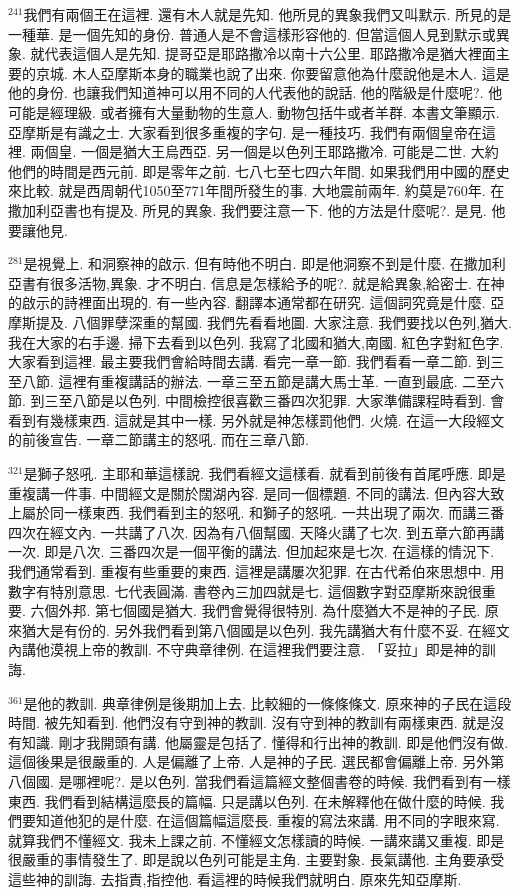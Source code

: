 \documentclass{book}
\begin{document}
$^{241}$我們有兩個王在這裡.
還有木人就是先知.
他所見的異象我們又叫默示.
所見的是一種華.
是一個先知的身份.
普通人是不會這樣形容他的.
但當這個人見到默示或異象.
就代表這個人是先知.
提哥亞是耶路撒冷以南十六公里.
耶路撒冷是猶大裡面主要的京城.
木人亞摩斯本身的職業也說了出來.
你要留意他為什麼說他是木人.
這是他的身份.
也讓我們知道神可以用不同的人代表他的說話.
他的階級是什麼呢?.
他可能是經理級.
或者擁有大量動物的生意人.
動物包括牛或者羊群.
本書文筆顯示.
亞摩斯是有識之士.
大家看到很多重複的字句.
是一種技巧.
我們有兩個皇帝在這裡.
兩個皇.
一個是猶大王烏西亞.
另一個是以色列王耶路撒冷.
可能是二世.
大約他們的時間是西元前.
即是零年之前.
七八七至七四六年間.
如果我們用中國的歷史來比較.
就是西周朝代1050至771年間所發生的事.
大地震前兩年.
約莫是760年.
在撒加利亞書也有提及.
所見的異象.
我們要注意一下.
他的方法是什麼呢?.
是見.
他要讓他見.

$^{281}$是視覺上.
和洞察神的啟示.
但有時他不明白.
即是他洞察不到是什麼.
在撒加利亞書有很多活物,異象.
才不明白.
信息是怎樣給予的呢?.
就是給異象,給密士.
在神的啟示的詩裡面出現的.
有一些內容.
翻譯本通常都在研究.
這個詞究竟是什麼.
亞摩斯提及.
八個罪孽深重的幫國.
我們先看看地圖.
大家注意.
我們要找以色列,猶大.
我在大家的右手邊.
掃下去看到以色列.
我寫了北國和猶大,南國.
紅色字對紅色字.
大家看到這裡.
最主要我們會給時間去講.
看完一章一節.
我們看看一章二節.
到三至八節.
這裡有重複講話的辦法.
一章三至五節是講大馬士革.
一直到最底.
二至六節.
到三至八節是以色列.
中間檢控很喜歡三番四次犯罪.
大家準備課程時看到.
會看到有幾樣東西.
這就是其中一樣.
另外就是神怎樣罰他們.
火燒.
在這一大段經文的前後宣告.
一章二節講主的怒吼.
而在三章八節.

$^{321}$是獅子怒吼.
主耶和華這樣說.
我們看經文這樣看.
就看到前後有首尾呼應.
即是重複講一件事.
中間經文是關於闊湖內容.
是同一個標題.
不同的講法.
但內容大致上屬於同一樣東西.
我們看到主的怒吼.
和獅子的怒吼.
一共出現了兩次.
而講三番四次在經文內.
一共講了八次.
因為有八個幫國.
天降火講了七次.
到五章六節再講一次.
即是八次.
三番四次是一個平衡的講法.
但加起來是七次.
在這樣的情況下.
我們通常看到.
重複有些重要的東西.
這裡是講屢次犯罪.
在古代希伯來思想中.
用數字有特別意思.
七代表圓滿.
書卷內三加四就是七.
這個數字對亞摩斯來說很重要.
六個外邦.
第七個國是猶大.
我們會覺得很特別.
為什麼猶大不是神的子民.
原來猶大是有份的.
另外我們看到第八個國是以色列.
我先講猶大有什麼不妥.
在經文內講他漠視上帝的教訓.
不守典章律例.
在這裡我們要注意.
「妥拉」即是神的訓誨.

$^{361}$是他的教訓.
典章律例是後期加上去.
比較細的一條條條文.
原來神的子民在這段時間.
被先知看到.
他們沒有守到神的教訓.
沒有守到神的教訓有兩樣東西.
就是沒有知識.
剛才我開頭有講.
他屬靈是包括了.
懂得和行出神的教訓.
即是他們沒有做.
這個後果是很嚴重的.
人是偏離了上帝.
人是神的子民.
選民都會偏離上帝.
另外第八個國.
是哪裡呢?.
是以色列.
當我們看這篇經文整個書卷的時候.
我們看到有一樣東西.
我們看到結構這麼長的篇幅.
只是講以色列.
在未解釋他在做什麼的時候.
我們要知道他犯的是什麼.
在這個篇幅這麼長.
重複的寫法來講.
用不同的字眼來寫.
就算我們不懂經文.
我未上課之前.
不懂經文怎樣讀的時候.
一講來講又重複.
即是很嚴重的事情發生了.
即是說以色列可能是主角.
主要對象.
長氣講他.
主角要承受這些神的訓誨.
去指責,指控他.
看這裡的時候我們就明白.
原來先知亞摩斯.
\end{document}
